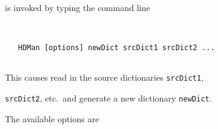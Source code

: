 




 is invoked by typing the command line


\begin{verbatim}


   HDMan [options] newDict srcDict1 srcDict2 ... 


\end{verbatim}


This causes  read in the source dictionaries \texttt{srcDict1},


\texttt{srcDict2}, etc.\ and generate a new dictionary \texttt{newDict}.


The available options are





